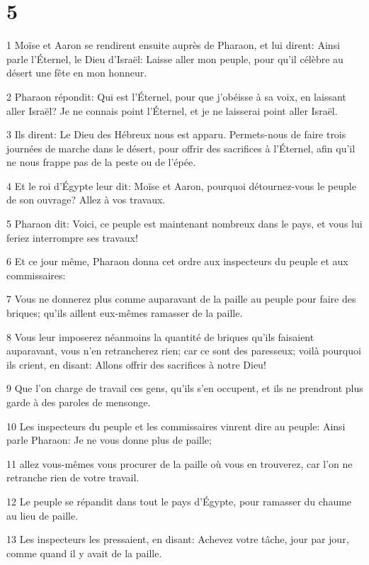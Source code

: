 \chapter{5}

\par 1 Moïse et Aaron se rendirent ensuite auprès de Pharaon, et lui dirent: Ainsi parle l'Éternel, le Dieu d'Israël: Laisse aller mon peuple, pour qu'il célèbre au désert une fête en mon honneur.
\par 2 Pharaon répondit: Qui est l'Éternel, pour que j'obéisse à sa voix, en laissant aller Israël? Je ne connais point l'Éternel, et je ne laisserai point aller Israël.
\par 3 Ils dirent: Le Dieu des Hébreux nous est apparu. Permets-nous de faire trois journées de marche dans le désert, pour offrir des sacrifices à l'Éternel, afin qu'il ne nous frappe pas de la peste ou de l'épée.
\par 4 Et le roi d'Égypte leur dit: Moïse et Aaron, pourquoi détournez-vous le peuple de son ouvrage? Allez à vos travaux.
\par 5 Pharaon dit: Voici, ce peuple est maintenant nombreux dans le pays, et vous lui feriez interrompre ses travaux!
\par 6 Et ce jour même, Pharaon donna cet ordre aux inspecteurs du peuple et aux commissaires:
\par 7 Vous ne donnerez plus comme auparavant de la paille au peuple pour faire des briques; qu'ils aillent eux-mêmes ramasser de la paille.
\par 8 Vous leur imposerez néanmoins la quantité de briques qu'ils faisaient auparavant, vous n'en retrancherez rien; car ce sont des paresseux; voilà pourquoi ils crient, en disant: Allons offrir des sacrifices à notre Dieu!
\par 9 Que l'on charge de travail ces gens, qu'ils s'en occupent, et ils ne prendront plus garde à des paroles de mensonge.
\par 10 Les inspecteurs du peuple et les commissaires vinrent dire au peuple: Ainsi parle Pharaon: Je ne vous donne plus de paille;
\par 11 allez vous-mêmes vous procurer de la paille où vous en trouverez, car l'on ne retranche rien de votre travail.
\par 12 Le peuple se répandit dans tout le pays d'Égypte, pour ramasser du chaume au lieu de paille.
\par 13 Les inspecteurs les pressaient, en disant: Achevez votre tâche, jour par jour, comme quand il y avait de la paille.
